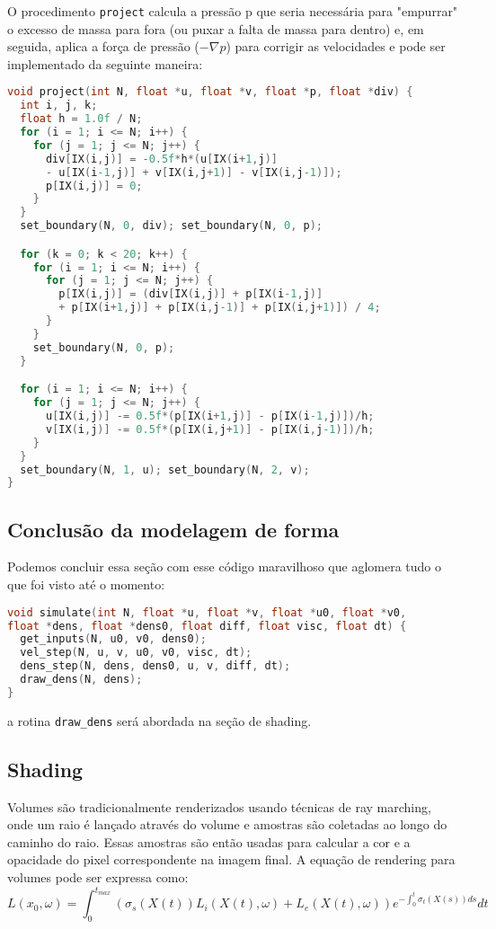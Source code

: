 O procedimento \texttt{project} calcula a pressão p que seria necessária para "empurrar" o excesso de massa para fora (ou puxar a falta de massa para dentro) e, em seguida, aplica a força de pressão ($-\nabla p$) para corrigir as velocidades e pode ser implementado da seguinte maneira:

\begin{lstlisting}[language=C]
void project(int N, float *u, float *v, float *p, float *div) {
  int i, j, k;
  float h = 1.0f / N;
  for (i = 1; i <= N; i++) {
    for (j = 1; j <= N; j++) {
      div[IX(i,j)] = -0.5f*h*(u[IX(i+1,j)]
      - u[IX(i-1,j)] + v[IX(i,j+1)] - v[IX(i,j-1)]);
      p[IX(i,j)] = 0;
    }
  }
  set_boundary(N, 0, div); set_boundary(N, 0, p);

  for (k = 0; k < 20; k++) {
    for (i = 1; i <= N; i++) {
      for (j = 1; j <= N; j++) {
        p[IX(i,j)] = (div[IX(i,j)] + p[IX(i-1,j)]
        + p[IX(i+1,j)] + p[IX(i,j-1)] + p[IX(i,j+1)]) / 4;
      }
    }
    set_boundary(N, 0, p);
  }

  for (i = 1; i <= N; i++) {
    for (j = 1; j <= N; j++) {
      u[IX(i,j)] -= 0.5f*(p[IX(i+1,j)] - p[IX(i-1,j)])/h;
      v[IX(i,j)] -= 0.5f*(p[IX(i,j+1)] - p[IX(i,j-1)])/h;
    }
  }
  set_boundary(N, 1, u); set_boundary(N, 2, v);
}
\end{lstlisting}

\subsection{Conclusão da modelagem de forma}
Podemos concluir essa seção com esse código maravilhoso que aglomera tudo o que foi visto até o momento:

\begin{lstlisting}[language=C]
void simulate(int N, float *u, float *v, float *u0, float *v0,
float *dens, float *dens0, float diff, float visc, float dt) {
  get_inputs(N, u0, v0, dens0);
  vel_step(N, u, v, u0, v0, visc, dt);
  dens_step(N, dens, dens0, u, v, diff, dt);
  draw_dens(N, dens);
}
\end{lstlisting}

a rotina \texttt{draw\_dens} será abordada na seção de shading.

\subsection{Shading}
\label{sec:shading}

Volumes são tradicionalmente renderizados usando técnicas de ray marching, onde um raio é lançado através do volume e amostras são coletadas ao longo do caminho do raio. Essas amostras são então usadas para calcular a cor e a opacidade do pixel correspondente na imagem final. A equação de rendering para volumes pode ser expressa como:
$$
L(x_0, \omega) = \int_{0}^{t_{max}} (\sigma_s(X(t)) L_i(X(t), \omega) + L_e(X(t), \omega))e^{-\int_{0}^{t} \sigma_t(X(s)) ds} dt
$$

